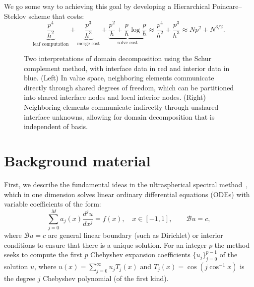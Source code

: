 \documentclass[review]{siamart171218}
\begin{document}
We go some way to achieving this goal by developing a Hierarchical Poincare--Steklov scheme that costs:
\[
 \underbrace{\frac{p^4}{h^2}}_{\text{leaf computation}} + \underbrace{\frac{p^3}{h^3}}_{\text{merge cost}} + \underbrace{\frac{p^2}{h} + \frac{p}{h}\log \frac{p}{h}}_{\text{solve cost}} \approx \frac{p^4}{h^2} + \frac{p^3}{h^3} \approx Np^2 + N^{3/2}. 
\]

\begin{figure}[htb]
  \centering
  \begin{minipage}{0.49\textwidth}
    \begin{center}
      \small
      \scalebox{0.4}{}
    \end{center}
  \end{minipage}%
  \begin{minipage}{0.49\textwidth}
    \begin{center}
      \small
      \scalebox{0.42}{}
    \end{center}
  \end{minipage}
  \vspace{1em}
  \caption{Two interpretations of domain decomposition using the Schur complement method, with interface data in red and interior data in blue. (Left) In value space, neighboring elements communicate directly through shared degrees of freedom, which can be partitioned into shared interface nodes and local interior nodes. (Right) Neighboring elements communicate indirectly through unshared interface unknowns, allowing for domain decomposition that is independent of basis.}
  \label{fig:dd_interpretations}
\end{figure}

\section{Background material}\label{sec:background}
First, we describe the fundamental ideas in the ultraspherical spectral method~\cite{Olver_13_01}, which in one dimension solves linear ordinary differential equations (ODEs) with variable coefficients of the form: 
\[
\sum_{j=0}^M a_j(x)\frac{d^ju}{dx^j} = f(x), \quad x\in[-1,1], \qquad \mathcal{B}u = c, 
\]
where $\mathcal{B}u=c$ are general linear boundary (such as Dirichlet) or interior conditions to ensure that there is a unique solution. For an integer $p$ the method seeks to compute the first $p$ Chebyshev expansion coefficients $\{u_j\}_{j=0}^{p-1}$ of the solution $u$, where $u(x) = \sum_{j=0}^\infty u_j T_j(x)$ and $T_j(x) = \cos(j\cos^{-1}x)$ is the degree $j$ Chebyshev polynomial (of the first kind). 
\end{document}
